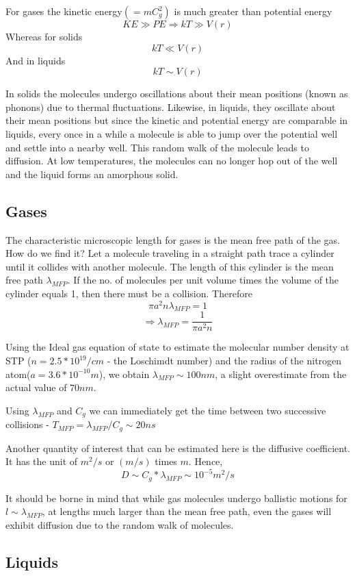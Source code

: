 \documentclass[11pt, letterpaper]{article}
\begin{document}
For gases the kinetic energy$(=mC_g^2)$ is much greater than potential energy
$$ 
KE \gg PE \Rightarrow kT \gg V(r) 
$$
Whereas for solids 
$$
kT \ll V(r)
$$
And in liquids
$$
kT \sim V(r)
$$

In solids the molecules undergo oscillations about their mean positions (known as phonons) due to thermal fluctuations. Likewise, in liquids, they oscillate about their mean positions but since the kinetic and potential energy are comparable in liquids, every once in a while a molecule is able to jump over the potential well and settle into a nearby well. This random walk of the molecule leads to diffusion. At low temperatures, the molecules can no longer hop out of the well and the liquid forms an amorphous solid. 

\subsection{Gases}

The characteristic microscopic length for gases is the mean free path of the gas. How do we find it? Let a molecule traveling in a straight path trace a cylinder until it collides with another molecule. The length of this cylinder is the mean free path $\lambda_{MFP}$. If the no. of molecules per unit volume times the volume of the cylinder equals 1, then there must be a collision. Therefore
$$
\pi a^2 n \lambda_{MFP} = 1 
$$
$$
\Rightarrow \lambda_{MFP} = \frac{1}{\pi a^2 n}
$$

Using the Ideal gas equation of state to estimate the molecular number density at STP ($n = 2.5 * 10^{19}/cm$ - the Loschimdt number) and the radius of the nitrogen atom($a = 3.6*10^{-10}m$), we obtain $\lambda_{MFP} \sim 100 nm$, a slight overestimate from the actual value of $70nm$. 

Using $\lambda_{MFP}$ and $C_g$ we can immediately get the time between two successive collisions - $T_{MFP} = \lambda_{MFP} / C_g \sim 20 ns $

Another quantity of interest that can be estimated here is the diffusive coefficient. It has the unit of $m^2/s$ or $(m/s)$ times $m$. Hence,
$$
D \sim C_g * \lambda_{MFP} \sim 10^{-5} m^2/s
$$

It should be borne in mind that while gas molecules undergo ballistic motions for $l \sim \lambda_{MFP}$, at lengths much larger than the mean free path, even the gases will exhibit diffusion due to the random walk of molecules.
 
\subsection{Liquids}
\end{document}
